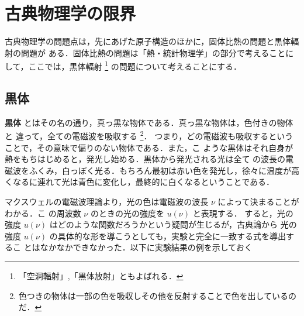 ﻿%
    \section{古典物理学の限界}
            \begin{mycomment}
                古典物理学の問題点は，先にあげた原子構造のほかに，固体比熱の問題と黒体輻射の問題が
                ある．固体比熱の問題は「熱・統計物理学」の部分で考えることにして，ここでは，黒体輻射
                    \footnote{
                        「空洞輻射」,「黒体放射」ともよばれる．
                    }
                の問題について考えることにする．
            \end{mycomment}

            \subsection{黒体}
                \textbf{黒体} とはその名の通り，真っ黒な物体である．真っ黒な物体は，色付きの物体と
                違って，全ての電磁波を吸収する
                    \footnote{
                        色つきの物体は一部の色を吸収しその他を反射することで色を出しているのだ．
                    }．
                つまり，どの電磁波も吸収するということで，その意味で偏りのない物体である．また，こ
                ような黒体はそれ自身が熱をもちはじめると，発光し始める．黒体から発光される光は全て
                の波長の電磁波をふくみ，白っぽく光る．もちろん最初は赤い色を発光し，徐々に温度が高
                くなるに連れて光は青色に変化し，最終的に白くなるということである．

                マクスウェルの電磁波理論より，光の色は電磁波の波長 $\nu$ によって決まることがわかる．こ
                の周波数 $\nu$ のときの光の強度を $u(\nu)$ と表現する．
                すると，光の強度 $u(\nu)$ はどのような関数だろうかという疑問が生じるが，古典論から
                光の強度 $u(\nu)$ の具体的な形を導こうとしても，実験と完全に一致する式を導出するこ
                とはなかなかできなかった．以下に実験結果の例を示しておく

